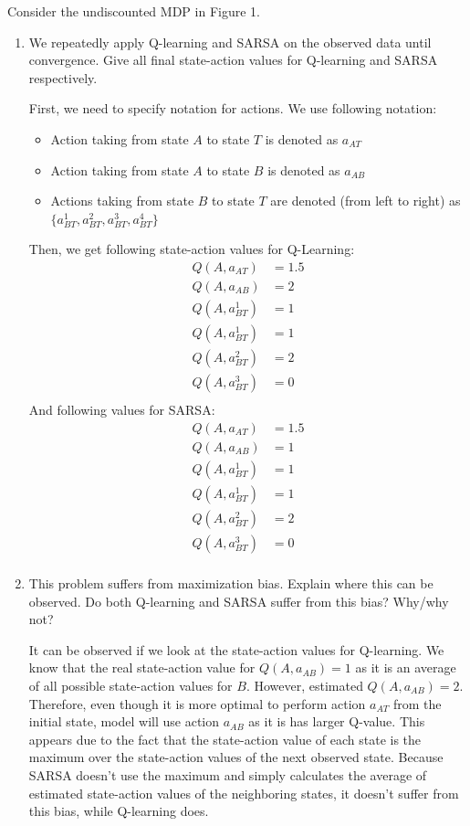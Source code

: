 \documentclass{exam}
\begin{document}
\begin{problem}
Consider the undiscounted MDP in Figure 1.
\begin{enumerate}
    \item We repeatedly apply Q-learning and SARSA on the observed data until convergence. Give all ﬁnal state-action values for Q-learning and SARSA respectively.
    \begin{solutionorlines}[2in]
    First, we need to specify notation for actions. We use following notation:
    \begin{itemize}
        \item Action taking from state $A$ to state $T$ is denoted as $a_{AT}$
        \item Action taking from state $A$ to state $B$ is denoted as $a_{AB}$
        \item Actions taking from state $B$ to state $T$ are denoted (from left to right) as $\{a_{BT}^1, a_{BT}^2, a_{BT}^3, a_{BT}^4\}$
    \end{itemize}
    Then, we get following state-action values for Q-Learning:
    \begin{align*}
        Q(A, a_{AT}) &= 1.5\\
        Q(A, a_{AB}) &= 2\\
        Q(A, a_{BT}^1) &= 1\\
        Q(A, a_{BT}^1) &= 1\\
        Q(A, a_{BT}^2) &= 2\\
        Q(A, a_{BT}^3) &= 0\\
    \end{align*}
    And following values for SARSA:
    \begin{align*}
        Q(A, a_{AT}) &= 1.5\\
        Q(A, a_{AB}) &= 1\\
        Q(A, a_{BT}^1) &= 1\\
        Q(A, a_{BT}^1) &= 1\\
        Q(A, a_{BT}^2) &= 2\\
        Q(A, a_{BT}^3) &= 0\\
    \end{align*}
    \end{solutionorlines}
    \item This problem suffers from maximization bias. Explain where this can be observed. Do both Q-learning and SARSA suffer from this bias? Why/why not?
    \begin{solutionorlines}[2in]
    It can be observed if we look at the state-action values for Q-learning. We know that the real state-action value for $Q(A, a_{AB}) = 1$ as it is an average of all possible state-action values for $B$. However, estimated $Q(A, a_{AB}) = 2$. Therefore, even though it is more optimal to perform action $a_{AT}$ from the initial state, model will use action $a_{AB}$ as it is has larger Q-value. This appears due to the fact that the state-action value of each state is the maximum over the state-action values of the next observed state. Because SARSA doesn't use the maximum and simply calculates the average of estimated state-action values of the neighboring states, it doesn't suffer from this bias, while Q-learning does. 

\end{solutionorlines}
\end{enumerate}
\end{problem}
\end{document}
